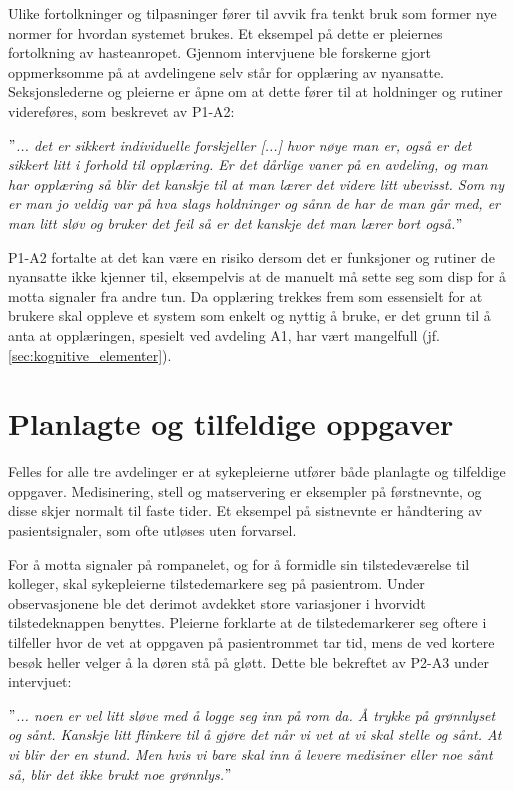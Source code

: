 \noindent
Ulike fortolkninger og tilpasninger fører til avvik fra tenkt bruk som former nye normer for hvordan systemet brukes. Et eksempel på dette er pleiernes fortolkning av hasteanropet. Gjennom intervjuene ble forskerne gjort oppmerksomme på at avdelingene selv står for opplæring av nyansatte. Seksjonslederne og pleierne er åpne om at dette fører til at holdninger og rutiner videreføres, som beskrevet av P1-A2:

\noindent
\textit{$"$... det er sikkert individuelle forskjeller [...] hvor nøye man er, også er det sikkert litt i forhold til opplæring. Er det dårlige vaner på en avdeling, og man har opplæring så blir det kanskje til at man lærer det videre litt ubevisst. Som ny er man jo veldig var på hva slags holdninger og sånn de har de man går med, er man litt sløv og bruker det feil så er det kanskje det man lærer bort også.$"$}

\noindent
P1-A2 fortalte at det kan være en risiko dersom det er funksjoner og rutiner de nyansatte ikke kjenner til, eksempelvis at de manuelt må sette seg som disp for å motta signaler fra andre tun. Da opplæring trekkes frem som essensielt for at brukere skal oppleve et system som enkelt og nyttig å bruke, er det grunn til å anta at opplæringen, spesielt ved avdeling A1, har vært mangelfull (jf. \ref{sec:kognitive_elementer}). 

\section{Planlagte og tilfeldige oppgaver}
Felles for alle tre avdelinger er at sykepleierne utfører både planlagte og tilfeldige oppgaver. Medisinering, stell og matservering er eksempler på førstnevnte, og disse skjer normalt til faste tider. Et eksempel på sistnevnte er håndtering av pasientsignaler, som ofte utløses uten forvarsel.  

\noindent
For å motta signaler på rompanelet, og for å formidle sin tilstedeværelse til kolleger, skal sykepleierne tilstedemarkere seg på pasientrom. Under observasjonene ble det derimot avdekket store variasjoner i hvorvidt tilstedeknappen benyttes. Pleierne forklarte at de tilstedemarkerer seg oftere i tilfeller hvor de vet at oppgaven på pasientrommet tar tid, mens de ved kortere besøk heller velger å la døren stå på gløtt. Dette ble bekreftet av P2-A3 under intervjuet: 

\noindent
\textit{$"$... noen er vel litt sløve med å logge seg inn på rom da. Å trykke på grønnlyset og sånt. Kanskje litt flinkere til å gjøre det når vi vet at vi skal stelle og sånt. At vi blir der en stund. Men hvis vi bare skal inn å levere medisiner eller noe sånt så, blir det ikke brukt noe grønnlys.$"$}

